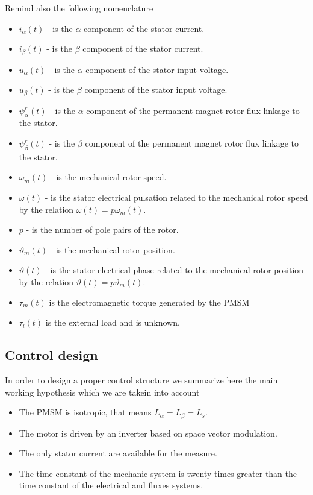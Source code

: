 \documentclass[11pt,a4paper]{scrartcl}
\numberwithin{equation}{section}
\theoremstyle{it}
\theoremstyle{definition}
\begin{document}
\begin{onehalfspace}
Remind also the following nomenclature
\begin{itemize}
	\item[--] $i_\alpha(t)$ - is the $\alpha$ component of the stator current.
	\item[--] $i_\beta(t)$ - is the $\beta$ component of the stator current.
	\item[--] $u_\alpha(t)$ - is the $\alpha$ component of the stator input voltage.
	\item[--] $u_\beta(t)$ - is the $\beta$ component of the stator input voltage.
	\item[--] $\psi_\alpha^r(t)$ - is the $\alpha$ component of the permanent magnet rotor flux linkage to the stator.
	\item[--] $\psi_\beta^r(t)$ - is the $\beta$ component of the permanent magnet rotor flux linkage to the stator.
	\item[--] $\omega_m(t)$ - is the mechanical rotor speed.
	\item[--] $\omega(t)$ - is the stator electrical pulsation related to the mechanical rotor speed by the relation $\omega(t)=p\omega_m(t)$.
	\item[--] $p$ - is the number of pole pairs of the rotor.
	\item[--] $\vartheta_m(t)$ - is the mechanical rotor position.
	\item[--] $\vartheta(t)$ - is the stator electrical phase related to the mechanical rotor position by the relation $\vartheta(t)=p\vartheta_m(t)$.
	\item[--] $\tau_m(t)$ is the electromagnetic torque generated by the PMSM
	\item[--] $\tau_l(t)$ is the external load and is unknown.
\end{itemize}

\subsection{Control design}
In order to design a proper control structure we summarize here the main working hypothesis which we are takein into account
\begin{itemize}
	\item[--] The PMSM is isotropic, that means $L_\alpha=L_\beta=L_s$.
	\item[--] The motor is driven by an inverter based on space vector 
	modulation.
	\item[--] The only stator current are available for the measure.
	\item[--] The time constant of the mechanic system is twenty times greater 
	than the time constant of the electrical and fluxes systems.
\end{itemize}


\end{onehalfspace}
\end{document}
